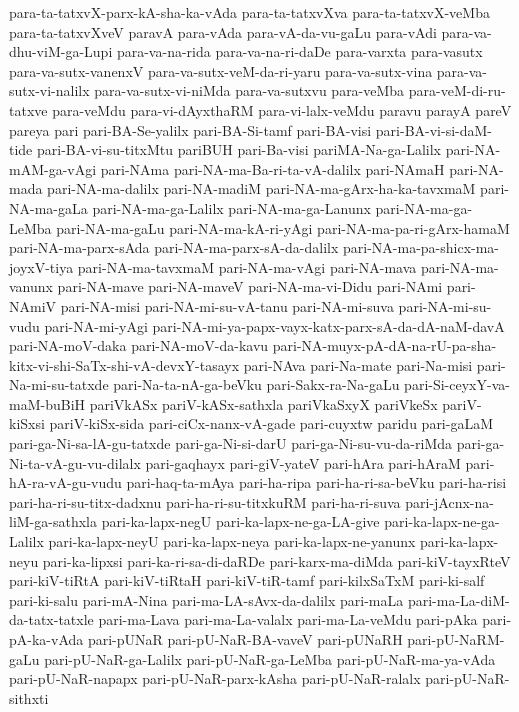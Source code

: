 {para-ta-tatxvX-parx-kA-sha-ka-vAda
para-ta-tatxvXva
para-ta-tatxvX-veMba
para-ta-tatxvXveV
paravA
para-vAda
para-vA-da-vu-gaLu
para-vAdi
para-va-dhu-viM-ga-Lupi
para-va-na-rida
para-va-na-ri-daDe
para-varxta
para-vasutx
para-va-sutx-vanenxV
para-va-sutx-veM-da-ri-yaru
para-va-sutx-vina
para-va-sutx-vi-nalilx
para-va-sutx-vi-niMda
para-va-sutxvu
para-veMba
para-veM-di-ru-tatxve
para-veMdu
para-vi-dAyxthaRM
para-vi-lalx-veMdu
paravu
parayA
pareV
pareya
pari
pari-BA-Se-yalilx
pari-BA-Si-tamf
pari-BA-visi
pari-BA-vi-si-daM-tide
pari-BA-vi-su-titxMtu
pariBUH
pari-Ba-visi
pariMA-Na-ga-Lalilx
pari-NA-mAM-ga-vAgi
pari-NAma
pari-NA-ma-Ba-ri-ta-vA-dalilx
pari-NAmaH
pari-NA-mada
pari-NA-ma-dalilx
pari-NA-madiM
pari-NA-ma-gArx-ha-ka-tavxmaM
pari-NA-ma-gaLa
pari-NA-ma-ga-Lalilx
pari-NA-ma-ga-Lanunx
pari-NA-ma-ga-LeMba
pari-NA-ma-gaLu
pari-NA-ma-kA-ri-yAgi
pari-NA-ma-pa-ri-gArx-hamaM
pari-NA-ma-parx-sAda
pari-NA-ma-parx-sA-da-dalilx
pari-NA-ma-pa-shicx-ma-joyxV-tiya
pari-NA-ma-tavxmaM
pari-NA-ma-vAgi
pari-NA-mava
pari-NA-ma-vanunx
pari-NA-mave
pari-NA-maveV
pari-NA-ma-vi-Didu
pari-NAmi
pari-NAmiV
pari-NA-misi
pari-NA-mi-su-vA-tanu
pari-NA-mi-suva
pari-NA-mi-su-vudu
pari-NA-mi-yAgi
pari-NA-mi-ya-papx-vayx-katx-parx-sA-da-dA-naM-davA
pari-NA-moV-daka
pari-NA-moV-da-kavu
pari-NA-muyx-pA-dA-na-rU-pa-sha-kitx-vi-shi-SaTx-shi-vA-devxY-tasayx
pari-NAva
pari-Na-mate
pari-Na-misi
pari-Na-mi-su-tatxde
pari-Na-ta-nA-ga-beVku
pari-Sakx-ra-Na-gaLu
pari-Si-ceyxY-va-maM-buBiH
pariVkASx
pariV-kASx-sathxla
pariVkaSxyX
pariVkeSx
pariV-kiSxsi
pariV-kiSx-sida
pari-ciCx-nanx-vA-gade
pari-cuyxtw
paridu
pari-gaLaM
pari-ga-Ni-sa-lA-gu-tatxde
pari-ga-Ni-si-darU
pari-ga-Ni-su-vu-da-riMda
pari-ga-Ni-ta-vA-gu-vu-dilalx
pari-gaqhayx
pari-giV-yateV
pari-hAra
pari-hAraM
pari-hA-ra-vA-gu-vudu
pari-haq-ta-mAya
pari-ha-ripa
pari-ha-ri-sa-beVku
pari-ha-risi
pari-ha-ri-su-titx-dadxnu
pari-ha-ri-su-titxkuRM
pari-ha-ri-suva
pari-jAcnx-na-liM-ga-sathxla
pari-ka-lapx-negU
pari-ka-lapx-ne-ga-LA-give
pari-ka-lapx-ne-ga-Lalilx
pari-ka-lapx-neyU
pari-ka-lapx-neya
pari-ka-lapx-ne-yanunx
pari-ka-lapx-neyu
pari-ka-lipxsi
pari-ka-ri-sa-di-daRDe
pari-karx-ma-diMda
pari-kiV-tayxRteV
pari-kiV-tiRtA
pari-kiV-tiRtaH
pari-kiV-tiR-tamf
pari-kilxSaTxM
pari-ki-salf
pari-ki-salu
pari-mA-Nina
pari-ma-LA-sAvx-da-dalilx
pari-maLa
pari-ma-La-diM-da-tatx-tatxle
pari-ma-Lava
pari-ma-La-valalx
pari-ma-La-veMdu
pari-pAka
pari-pA-ka-vAda
pari-pUNaR
pari-pU-NaR-BA-vaveV
pari-pUNaRH
pari-pU-NaRM-gaLu
pari-pU-NaR-ga-Lalilx
pari-pU-NaR-ga-LeMba
pari-pU-NaR-ma-ya-vAda
pari-pU-NaR-napapx
pari-pU-NaR-parx-kAsha
pari-pU-NaR-ralalx
pari-pU-NaR-sithxti
}
